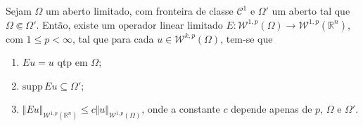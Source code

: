 \documentclass[a4paper, 11pt]{book}
\theoremstyle{definition}
\newcommand{\bR}{\mathbb{R}}
\newcommand{\cC}{\mathcal{C}}
\newcommand{\cW}{\mathcal{W}}
\newcommand{\supp}{\mathrm{supp}\,}
\begin{document}
\begin{tbox} \label{thm:extensao}
        Sejam $\Omega$ um aberto limitado, com fronteira de classe $\cC^1$ e $\Omega'$ um aberto tal que $\Omega \Subset \Omega'$. Então, existe um operador linear limitado $E : \cW^{1,p}(\Omega) \to \cW^{1,p}(\bR ^n)$, com $1 \leqslant p < \infty$, tal que para cada $u \in \cW^{k,p}(\Omega)$, tem-se que
    \begin{enumerate}[leftmargin=*, label=\textbf{(\alph*)}]
        \item $Eu = u$ qtp em $\Omega$;
        \item $\supp Eu \subseteq \Omega'$;
        \item $\Vert Eu \Vert_{\cW^{1,p}(\bR^n)} \leqslant c \Vert u \Vert_{\cW^{1,p}(\Omega)}$, onde a constante $c$ depende apenas de $p$, $\Omega$ e $\Omega'$.
    \end{enumerate}
\end{tbox}
\end{document}
